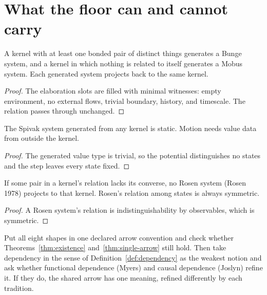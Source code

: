 \chapter{What the floor can and cannot carry}

\begin{theorem}
  \label{thm:view-roundtrip}
  \leanok
  A kernel with at least one bonded pair of distinct things generates a Bunge
  system, and a kernel in which nothing is related to itself generates a Mobus
  system. Each generated system projects back to the same kernel.
\end{theorem}

\begin{proof}
  \leanok
  The elaboration slots are filled with minimal witnesses: empty environment,
  no external flows, trivial boundary, history, and timescale. The relation
  passes through unchanged.
\end{proof}

\begin{theorem}
  \label{thm:spivak-static}
  \leanok
  The Spivak system generated from any kernel is static. Motion needs value
  data from outside the kernel.
\end{theorem}

\begin{proof}
  \leanok
  The generated value type is trivial, so the potential distinguishes no
  states and the step leaves every state fixed.
\end{proof}

\begin{theorem}
  \label{thm:rosen-no-view}
  \leanok
  If some pair in a kernel's relation lacks its converse, no Rosen system
  (Rosen 1978) projects to that kernel. Rosen's relation among states is
  always symmetric.
\end{theorem}

\begin{proof}
  \leanok
  A Rosen system's relation is indistinguishability by observables, which is
  symmetric.
\end{proof}

\begin{problem}
  \label{prob:arrow-meaning}
  Put all eight shapes in one declared arrow convention and check whether
  Theorems~\ref{thm:existence} and~\ref{thm:single-arrow} still hold. Then
  take dependency in the sense of Definition~\ref{def:dependency} as the
  weakest notion and ask whether functional dependence (Myers) and causal
  dependence (Joslyn) refine it. If they do, the shared arrow has one
  meaning, refined differently by each tradition.
\end{problem}

